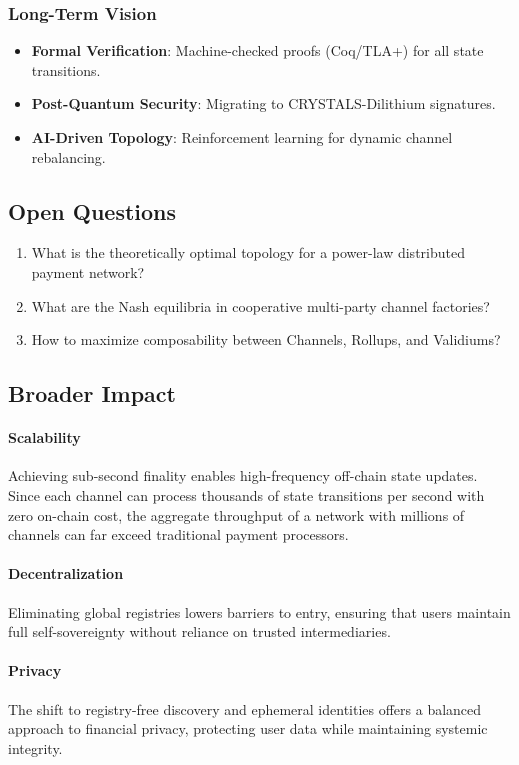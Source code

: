 \subsubsection{Long-Term Vision}
\begin{itemize}
    \item \textbf{Formal Verification}: Machine-checked proofs (Coq/TLA+) for all state transitions.
    \item \textbf{Post-Quantum Security}: Migrating to CRYSTALS-Dilithium signatures.
    \item \textbf{AI-Driven Topology}: Reinforcement learning for dynamic channel rebalancing.
\end{itemize}

\subsection{Open Questions}
\begin{enumerate}
    \item What is the theoretically optimal topology for a power-law distributed payment network?
    \item What are the Nash equilibria in cooperative multi-party channel factories?
    \item How to maximize composability between Channels, Rollups, and Validiums?
\end{enumerate}

\subsection{Broader Impact}

\paragraph{Scalability}
Achieving sub-second finality enables high-frequency off-chain state updates. Since each channel can process thousands of state transitions per second with zero on-chain cost, the aggregate throughput of a network with millions of channels can far exceed traditional payment processors.

\paragraph{Decentralization}
Eliminating global registries lowers barriers to entry, ensuring that users maintain full self-sovereignty without reliance on trusted intermediaries.

\paragraph{Privacy}
The shift to registry-free discovery and ephemeral identities offers a balanced approach to financial privacy, protecting user data while maintaining systemic integrity.

